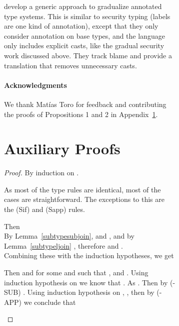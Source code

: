 \documentclass[authoryear,sort&compress,9pt,twocolumn,nocopyrightspace]{sigplanconf}
\newcommand{\lsec}{\xspace}
\newcommand{\?}{\textsf{\upshape ?}} \newcommand{\consistent}[1]{\widetilde{#1}}
\begin{document}
\begin{figure}[h]
\begin{small}
\begin{figure}[h]
\begin{small}
\citet{thiemannFennell:esop2014} develop a generic approach to gradualize
annotated type systems. This is similar to security typing (labels are one kind
of annotation), except that they only consider annotation on base types, and
the language only includes explicit casts, like the gradual security work
discussed above.  They track blame and provide a translation that removes
unnecessary casts.


\paragraph{Acknowledgments} We thank Mat{\'i}as Toro for feedback and contributing
the proofs of Propositions 1 and 2 in Appendix~\ref{sec:auxiliary-proofs}.  




{}


\appendix

\section{Auxiliary Proofs}
\label{sec:auxiliary-proofs}



\syntypein*
\begin{proof}
  By induction on .  




  As most of the type rules are identical, most of the cases are
  straightforward. The exceptions to this are the (Sif) and (Sapp) rules.
\begin{case}[Sif]
    Then \\

      By Lemma~\ref{subtypesubjoin},  and
      , and by Lemma~\ref{subtypeljoin}
      , therefore
       and
      .\\
Combining these with the induction hypotheses, we get


\end{case}



  \begin{case}[Sapp]
    Then  and  for some  and  such that ,  and . Using induction hypothesis on  we know that . As . Then by (\lsec-SUB) .
    Using induction hypothesis on , , then by (\lsec-APP) we conclude that 
  \end{case}

\end{proof}


\end{small}
\end{figure}
\end{small}
\end{figure}
\end{document}
